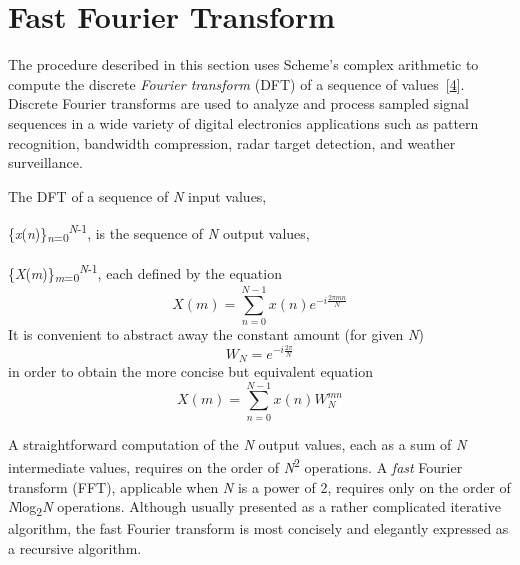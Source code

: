 \section{\label{examples_g198}\label{examples_h9}Fast Fourier Transform\label{examples_SECTEXFFT}}



The procedure described in this section uses Scheme's
\label{examples_s69}complex arithmetic
to compute the discrete
\label{examples_s70}\textit{Fourier transform}
(DFT) of a sequence of values [\hyperref[bibliography_g222]{4}].
Discrete Fourier transforms are used to analyze and process sampled
signal sequences in a wide variety of digital electronics applications
such as pattern recognition, bandwidth compression, radar target
detection, and weather surveillance.


The DFT of a sequence of \textit{N} input values,

\{\textit{x}(\textit{n})\}\textsubscript{\textit{n}=0}\textsuperscript{\textit{N}-1},
is the sequence of \textit{N} output values,

\{\textit{X}(\textit{m})\}\textsubscript{\textit{m}=0}\textsuperscript{\textit{N}-1},
each defined by the equation
\[X(m) = \sum^{N-1}_{n=0}x(n)e^{-i\frac{2\pi{}mn}{N}}\]
It is convenient to abstract away the constant amount (for given \textit{N})
\[W_N=e^{-i\frac{2\pi}{N}}\]
in order to obtain the more concise but equivalent equation
\[X(m) = \sum^{N-1}_{n=0}x(n)W_N^{mn}\]


A straightforward computation of the \textit{N} output values, each as a sum
of \textit{N} intermediate values, requires on the order of \textit{N}\textsuperscript{2} operations.
A \textit{fast} Fourier transform (FFT), applicable when \textit{N} is a power
of 2, requires only on the order of \textit{N}log\textsubscript{2}\textit{N} operations.
Although usually presented as a rather complicated iterative
algorithm, the fast Fourier transform
is most concisely and elegantly expressed as a recursive
algorithm.


